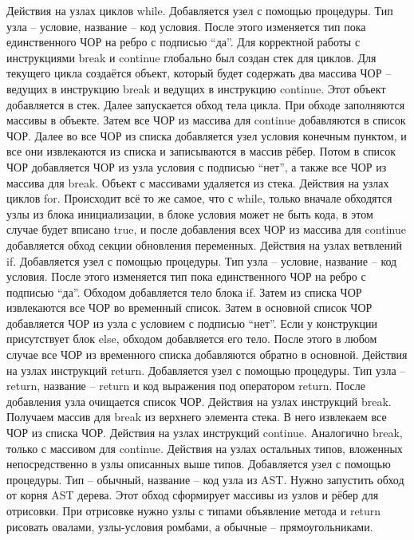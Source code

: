 Действия на узлах циклов while. Добавляется узел с помощью процедуры. Тип узла – условие, название – код условия. После этого изменяется тип пока единственного ЧОР на ребро с подписью “да”. Для корректной работы с инструкциями break и continue глобально был создан стек для циклов. Для текущего цикла создаётся объект, который будет содержать два массива ЧОР – ведущих в инструкцию break и ведущих в инструкцию continue. Этот объект добавляется в стек. Далее запускается обход тела цикла. При обходе заполняются массивы в объекте. Затем все ЧОР из массива для continue добавляются в список ЧОР. Далее во все ЧОР из списка добавляется узел условия конечным пунктом, и все они извлекаются из списка и записываются в массив рёбер. Потом в список ЧОР добавляется ЧОР из узла условия с подписью “нет”, а также все ЧОР из массива для break. Объект с массивами удаляется из стека.
Действия на узлах циклов for. Происходит всё то же самое, что с while, только вначале обходятся узлы из блока инициализации, в блоке условия может не быть кода, в этом случае будет вписано true, и после добавления всех ЧОР из массива для continue добавляется обход секции обновления переменных.
Действия на узлах ветвлений if. Добавляется узел с помощью процедуры. Тип узла – условие, название – код условия. После этого изменяется тип пока единственного ЧОР на ребро с подписью “да”. Обходом добавляется тело блока if. Затем из списка ЧОР извлекаются все ЧОР во временный список. Затем в основной список ЧОР добавляется ЧОР из узла с условием с подписью “нет”. Если у конструкции присутствует блок else, обходом добавляется его тело. После этого в любом случае все ЧОР из временного списка добавляются обратно в основной.
Действия на узлах инструкций return. Добавляется узел с помощью процедуры. Тип узла – return, название – return и код выражения под оператором return. После добавления узла очищается список ЧОР.
Действия на узлах инструкций break. Получаем массив для break из верхнего элемента стека. В него извлекаем все ЧОР из списка ЧОР.
Действия на узлах инструкций continue. Аналогично break, только с массивом для continue.
Действия на узлах остальных типов, вложенных непосредственно в узлы описанных выше типов. Добавляется узел с помощью процедуры. Тип – обычный, название – код узла из AST.
Нужно запустить обход от корня AST дерева. Этот обход сформирует массивы из узлов и рёбер для отрисовки.
При отрисовке нужно узлы с типами объявление метода и return рисовать овалами, узлы-условия ромбами, а обычные – прямоугольниками.

